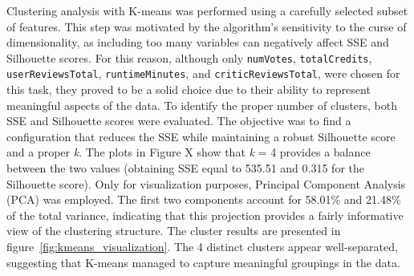 Clustering analysis with K-means was performed using a carefully selected subset of features. 
This step was motivated by the algorithm's sensitivity to the curse of dimensionality, as including too many variables can negatively affect SSE and Silhouette scores.
For this reason, although only \texttt{numVotes}, \texttt{totalCredits}, \texttt{userReviewsTotal}, \texttt{runtimeMinutes}, and \texttt{criticReviewsTotal},
were chosen for this task, they proved to be a solid choice due to their ability to represent meaningful aspects of the data.
To identify the proper number of clusters, both SSE and Silhouette scores were evaluated. 
The objective was to find a configuration that reduces the SSE while maintaining a robust Silhouette score and a proper \textit{k}. 
The plots in Figure X show that \textit{k} = 4 provides a balance between the two values (obtaining SSE equal to 535.51 and 0.315 for the Silhouette score).
Only for visualization purposes, Principal Component Analysis (PCA) was employed. 
The first two components account for 58.01\% and 21.48\% of the total variance, indicating that this projection provides a fairly informative view of the clustering structure. 
The cluster results are presented in figure~\ref{fig:kmeans_visualization}. 
The 4 distinct clusters appear well-separated, suggesting that K-means managed to capture meaningful groupings in the data.




 

